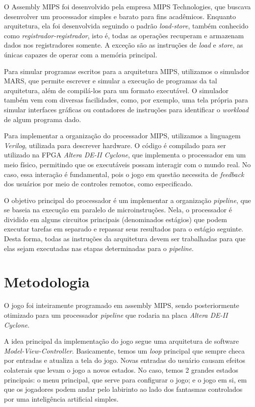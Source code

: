 \documentclass[12pt, a4paper, twocolumn]{article}
\begin{document}
O Assembly MIPS foi desenvolvido pela empresa MIPS Technologies, que buscava desenvolver um processador simples e barato para fins acadêmicos. Enquanto arquitetura, ela foi desenvolvida seguindo o padrão \textit{load-store}, também conhecido como \textit{registrador-registrador}, isto é, todas as operações recuperam e armazenam dados nos registradores somente. A exceção são as instruções de \textit{load} e \textit{store}, as únicas capazes de operar com a memória principal.

Para simular programas escritos para a arquitetura MIPS, utilizamos o simulador MARS, que permite escrever e simular a execução de programas da tal arquitetura, além de compilá-los para um formato executável. O simulador também vem com diversas facilidades, como, por exemplo, uma tela própria para simular interfaces gráficas ou contadores de instruções para identificar o \textit{workload} de algum programa dado.

Para implementar a organização do processador MIPS, utilizamos a linguagem \textit{Verilog}, utilizada para descrever hardware. O código é compilado para ser utilizado na FPGA \textit{Altera DE-II Cyclone}, que implementa o processador em um meio físico, permitindo que os executáveis possam interagir com o mundo real. No caso, essa interação é fundamental, pois o jogo em questão necessita de \textit{feedback} dos usuários por meio de controles remotos, como especificado.

O objetivo principal do processador é um implementar a organização \textit{pipeline}, que se baseia na execução em paralelo de microinstruções. Nela, o processador é dividido em alguns circuitos principais (denominados  estágios) que podem executar tarefas em separado e repassar seus resultados para o estágio seguinte. Desta forma, todas as instruções da arquitetura devem ser trabalhadas para que elas sejam executadas nas etapas determinadas para o \textit{pipeline}.


\section{Metodologia}

O jogo foi inteiramente programado em assembly MIPS, sendo posteriormente otimizado para um processador \textit{pipeline} que rodaria na placa \textit{Altera DE-II Cyclone}.

A idea principal da implementação do jogo segue uma arquitetura de software \textit{Model-View-Controller}. Basicamente, temos um \textit{loop} principal que sempre checa por entradas e atualiza a tela do jogo. Novas entradas do usuário causam efeitos colaterais que levam o jogo a novos estados. No caso, temos 2 grandes estados principais: o menu principal, que serve para configurar o jogo; e o jogo em si, em que os jogadores podem andar pelo labirinto ao lado dos fantasmas controlados por uma inteligência artificial simples.
\end{document}
